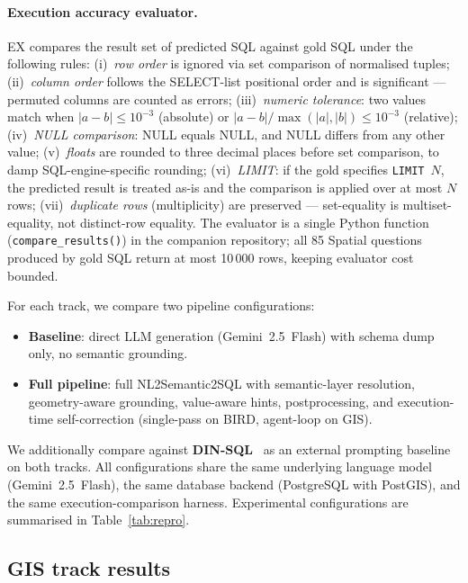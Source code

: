 \documentclass[11pt]{article}
\begin{document}
\paragraph{Execution accuracy evaluator.}
EX compares the result set of predicted SQL against gold SQL under the
following rules:
(i)~\emph{row order} is ignored via set comparison of normalised tuples;
(ii)~\emph{column order} follows the SELECT-list positional order and is
significant --- permuted columns are counted as errors;
(iii)~\emph{numeric tolerance}: two values match when
$|a-b| \le 10^{-3}$ (absolute) or $|a-b| / \max(|a|,|b|) \le 10^{-3}$
(relative);
(iv)~\emph{NULL comparison}: NULL equals NULL, and NULL differs from any
other value;
(v)~\emph{floats} are rounded to three decimal places before set
comparison, to damp SQL-engine-specific rounding;
(vi)~\emph{LIMIT}: if the gold specifies \texttt{LIMIT}~$N$, the predicted
result is treated as-is and the comparison is applied over at most $N$ rows;
(vii)~\emph{duplicate rows} (multiplicity) are preserved --- set-equality
is multiset-equality, not distinct-row equality.
The evaluator is a single Python function (\texttt{compare\_results()}) in
the companion repository; all 85 Spatial questions produced by gold SQL
return at most 10\,000 rows, keeping evaluator cost bounded.

For each track, we compare two pipeline configurations:
\begin{itemize}[leftmargin=*]
  \item \textbf{Baseline}: direct LLM generation (Gemini~2.5~Flash) with schema dump only, no semantic grounding.
  \item \textbf{Full pipeline}: full NL2Semantic2SQL with semantic-layer resolution, geometry-aware grounding, value-aware hints, postprocessing, and execution-time self-correction (single-pass on BIRD, agent-loop on GIS).
\end{itemize}

We additionally compare against \textbf{DIN-SQL}~\cite{pourreza2023dinsql} as an external prompting baseline on both tracks. All configurations share the same underlying language model (Gemini~2.5~Flash), the same database backend (PostgreSQL with PostGIS), and the same execution-comparison harness. Experimental configurations are summarised in Table~\ref{tab:repro}.

\subsection{GIS track results}
\label{sec:gis-results}
\end{document}
